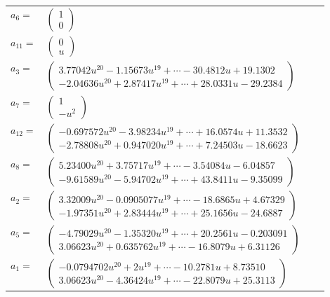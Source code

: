 \documentclass[1p]{elsarticle_modified}
\theoremstyle{definition}
\begin{document}
\begin{tabular}{m{7pt} m{180pt} m{7pt} m{180pt} }
\flushright $a_{6}=$&$\begin{pmatrix}1\\0\end{pmatrix}$ \\
\flushright $a_{11}=$&$\begin{pmatrix}0\\u\end{pmatrix}$ \\
\flushright $a_{3}=$&$\begin{pmatrix}3.77042 u^{20}-1.15673 u^{19}+\cdots-30.4812 u+19.1302\\-2.04636 u^{20}+2.87417 u^{19}+\cdots+28.0331 u-29.2384\end{pmatrix}$ \\
\flushright $a_{7}=$&$\begin{pmatrix}1\\- u^2\end{pmatrix}$ \\
\flushright $a_{12}=$&$\begin{pmatrix}-0.697572 u^{20}-3.98234 u^{19}+\cdots+16.0574 u+11.3532\\-2.78808 u^{20}+0.947020 u^{19}+\cdots+7.24503 u-18.6623\end{pmatrix}$ \\
\flushright $a_{8}=$&$\begin{pmatrix}5.23400 u^{20}+3.75717 u^{19}+\cdots-3.54084 u-6.04857\\-9.61589 u^{20}-5.94702 u^{19}+\cdots+43.8411 u-9.35099\end{pmatrix}$ \\
\flushright $a_{2}=$&$\begin{pmatrix}3.32009 u^{20}-0.0905077 u^{19}+\cdots-18.6865 u+4.67329\\-1.97351 u^{20}+2.83444 u^{19}+\cdots+25.1656 u-24.6887\end{pmatrix}$ \\
\flushright $a_{5}=$&$\begin{pmatrix}-4.79029 u^{20}-1.35320 u^{19}+\cdots+20.2561 u-0.203091\\3.06623 u^{20}+0.635762 u^{19}+\cdots-16.8079 u+6.31126\end{pmatrix}$ \\
\flushright $a_{1}=$&$\begin{pmatrix}-0.0794702 u^{20}+2 u^{19}+\cdots-10.2781 u+8.73510\\3.06623 u^{20}-4.36424 u^{19}+\cdots-22.8079 u+25.3113\end{pmatrix}$ \\

\end{tabular}
\end{document}
